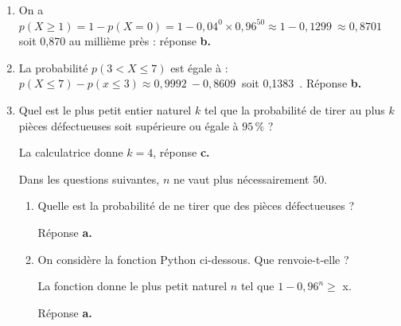 \documentclass[10pt]{article}
\providecommand{\np}[2][]{{#2~#1}}
\begin{document}
\begin{enumerate}
\item 
On a $p(X\geqslant 1) = 1 - p(X = 0) = 1 - 0,04^0 \times 0,96^{50} \approx 1 - \np{0,1299} \approx \np{0,8701}$ soit 0,870 au millième près : réponse \textbf{b.~~}






\item La probabilité $p(3 < X \leqslant 7)$ est égale à :
$p(X \leqslant 7) - p(x \leqslant 3) \approx \np{0,9992} - \np{0,8609}$ soit \np{0,1383}. Réponse \textbf{b.~~}








\item Quel est le plus petit entier naturel $k$ tel que la probabilité de tirer au plus $k$ pièces défectueuses soit supérieure ou égale à $95\,\%$ ?







La calculatrice donne $k = 4$, réponse \textbf{c.}

Dans les questions suivantes, $n$ ne vaut plus nécessairement $50$.

\begin{enumerate}[resume]
\item Quelle est la probabilité de ne tirer que des pièces défectueuses ?






Réponse \textbf{a.}
\item On considère la fonction Python ci-dessous. Que renvoie-t-elle ?
















La fonction donne le plus petit naturel $n$ tel que $1 - 0,96^n \geqslant $ x.

Réponse \textbf{a.}
	\end{enumerate}
\end{enumerate}
\end{document}
